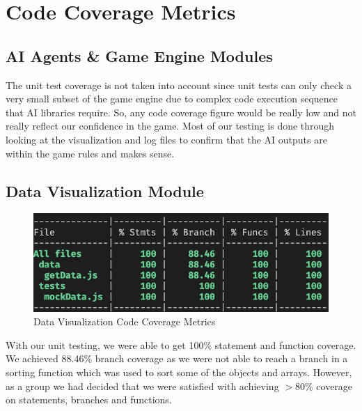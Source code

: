 \documentclass[12pt, titlepage]{article}
\begin{document}
\section{Code Coverage Metrics}
\subsection{AI Agents & Game Engine Modules}
The unit test coverage is not taken into account since unit tests can only check a very small subset of the game engine due to complex code execution sequence that AI libraries require. So, any code coverage figure would be really low and not really reflect our confidence in the game. Most of our testing is done through looking at the visualization and log files to confirm that the AI outputs are within the game rules and makes sense.
\subsection{Data Visualization Module}
\begin{figure}[!ht]
    \centering
    \includegraphics[width=\textwidth]{DataVisualizationCoverage.png}
    \caption{Data Visualization Code Coverage Metrics}
    \label{Data Visualization Code Coverage Metrics}
\end{figure}
\label{Code Coverage Data Visualization}
With our unit testing, we were able to get 100\% statement and function coverage. We achieved 88.46\% branch coverage as we were not able to reach a branch in a sorting function which was used to sort some of the objects and arrays. However, as a group we had decided that we were satisfied with achieving $> 80\%$ coverage on statements, branches and functions. 

\newpage
\end{document}
